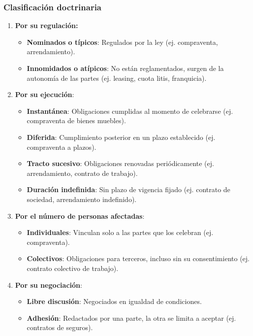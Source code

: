 \documentclass{templateNote}
\begin{document}
\subsubsection{Clasificación doctrinaria}
\begin{enumerate}
    \item \textbf{Por su regulación:}
    \begin{itemize}
        \item \textbf{Nominados o típicos}: Regulados por la ley (ej. compraventa, arrendamiento).
        \item \textbf{Innomidados o atípicos}: No están reglamentados, surgen de la autonomía de las partes (ej. leasing, cuota litis, franquicia).
    \end{itemize}
    \item \textbf{Por su ejecución}:
    \begin{itemize}
        \item \textbf{Instantánea}: Obligaciones cumplidas al momento de celebrarse (ej. compraventa de bienes muebles).
        \item \textbf{Diferida}: Cumplimiento posterior en un plazo establecido (ej. compraventa a plazos).
        \item \textbf{Tracto sucesivo}: Obligaciones renovadas periódicamente (ej. arrendamiento, contrato de trabajo).
        \item \textbf{Duración indefinida}: Sin plazo de vigencia fijado (ej. contrato de sociedad, arrendamiento indefinido).
    \end{itemize}
    \item \textbf{Por el número de personas afectadas}:
    \begin{itemize}
        \item \textbf{Individuales}: Vinculan solo a las partes que los celebran (ej. compraventa).
        \item \textbf{Colectivos}: Obligaciones para terceros, incluso sin su consentimiento (ej. contrato colectivo de trabajo).
    \end{itemize}
    \item \textbf{Por su negociación}:
    \begin{itemize}
        \item \textbf{Libre discusión}: Negociados en igualdad de condiciones.
        \item \textbf{Adhesión}: Redactados por una parte, la otra se limita a aceptar (ej. contratos de seguros).
    \end{itemize}

\end{enumerate}
\end{document}
